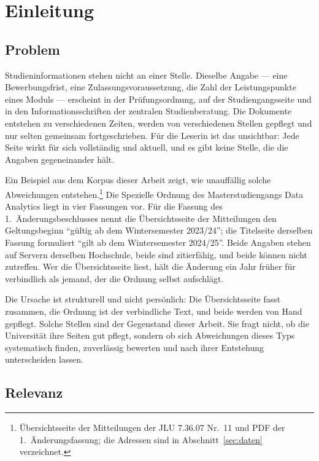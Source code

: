 
\section{Einleitung}
\label{sec:einleitung}

\subsection{Problem}

Studieninformationen stehen nicht an einer Stelle. Dieselbe Angabe --- eine Bewerbungsfrist,
eine Zulassungsvoraussetzung, die Zahl der Leistungspunkte eines Moduls --- erscheint in der
Prüfungsordnung, auf der Studiengangsseite und in den Informationsschriften der zentralen
Studienberatung. Die Dokumente entstehen zu verschiedenen Zeiten, werden von verschiedenen
Stellen gepflegt und nur selten gemeinsam fortgeschrieben. Für die Leserin ist das
unsichtbar: Jede Seite wirkt für sich vollständig und aktuell, und es gibt keine Stelle, die
die Angaben gegeneinander hält.

Ein Beispiel aus dem Korpus dieser Arbeit zeigt, wie unauffällig solche Abweichungen
entstehen.\footnote{Übersichtsseite der Mitteilungen der JLU 7.36.07 Nr.~11 und PDF der
1.~Änderungsfassung; die Adressen sind in Abschnitt~\ref{sec:daten} verzeichnet.} Die
Spezielle Ordnung des Masterstudiengangs Data Analytics liegt in vier Fassungen vor. Für die
Fassung des 1.~Änderungsbeschlusses nennt die Übersichtsseite der Mitteilungen den
Geltungsbeginn \enquote{gültig ab dem Wintersemester 2023/24}; die Titelseite derselben
Fassung formuliert \enquote{gilt ab dem Wintersemester 2024/25}. Beide Angaben stehen auf
Servern derselben Hochschule, beide sind zitierfähig, und beide können nicht zutreffen. Wer
die Übersichtsseite liest, hält die Änderung ein Jahr früher für verbindlich als jemand, der
die Ordnung selbst aufschlägt.

Die Ursache ist strukturell und nicht persönlich: Die Übersichtsseite fasst zusammen, die
Ordnung ist der verbindliche Text, und beide werden von Hand gepflegt. Solche Stellen sind
der Gegenstand dieser Arbeit. Sie fragt nicht, ob die Universität ihre Seiten gut pflegt,
sondern ob sich Abweichungen dieses Typs systematisch finden, zuverlässig bewerten und nach
ihrer Entstehung unterscheiden lassen.

\subsection{Relevanz}


